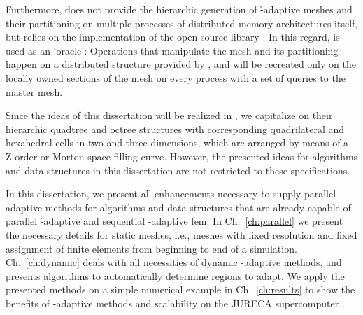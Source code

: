 Furthermore, \dealii{} does not provide the hierarchic generation of \h-adaptive meshes and their partitioning on multiple processes of distributed memory architectures itself, but relies on the implementation of the open-source library \pforest{} \parencite{burstedde2011,p4est22}. In this regard, \pforest{} is used as an `oracle': Operations that manipulate the mesh and its partitioning happen on a distributed structure provided by \pforest{}, and will be recreated only on the locally owned sections of the \dealii{} mesh
on every process with a set of queries to the master mesh.

Since the ideas of this dissertation will be realized in \dealii{}, we capitalize on their hierarchic quadtree and octree structures with corresponding quadrilateral and hexahedral cells in two and three dimensions, which are arranged by means of a Z-order or Morton space-filling curve.
However, the presented ideas for algorithms and data structures in this dissertation are not restricted to these specifications.



In this dissertation, we present all enhancements necessary to supply parallel \hp-adaptive methods for algorithms and data structures that are already capable of parallel \h-adaptive and sequential \hp-adaptive \gls{fem}. In Ch.~\ref{ch:parallel} we present the necessary details for static meshes, i.e., meshes with fixed resolution and fixed assignment of finite elements from beginning to end of a simulation. Ch.~\ref{ch:dynamic} deals with all necessities of dynamic \hp-adaptive methods, and presents algorithms to automatically determine regions to adapt. We apply the presented methods on a simple numerical example in Ch.~\ref{ch:results} to show the benefits of \hp-adaptive methods and scalability on the JURECA supercomputer \parencite{krause2016,jureca}.

